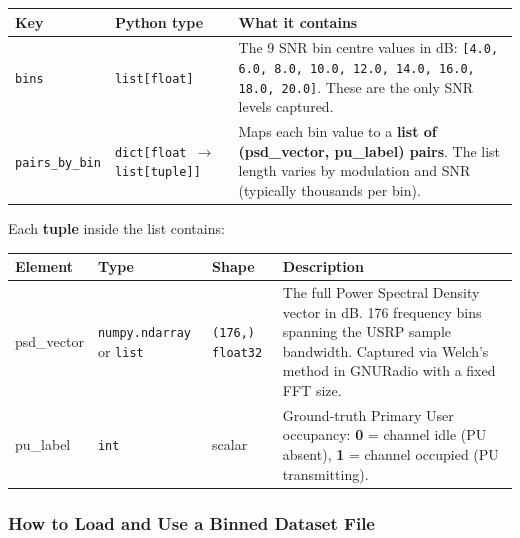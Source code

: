 \documentclass[11pt,a4paper]{article}
\begin{document}
\begin{center}
\renewcommand{\arraystretch}{1.35}
\begin{tabularx}{\textwidth}{>{\ttfamily}l l X}
\toprule
\textbf{Key} & \textbf{Python type} & \textbf{What it contains} \\
\midrule
\texttt{bins}
  & \texttt{list[float]}
  & The 9 SNR bin centre values in dB:
    \texttt{[4.0, 6.0, 8.0, 10.0, 12.0, 14.0, 16.0, 18.0, 20.0]}.
    These are the only SNR levels captured. \\[4pt]
\texttt{pairs\_by\_bin}
  & \texttt{dict[float $\to$ list[tuple]]}
  & Maps each bin value to a \textbf{list of (psd\_vector, pu\_label) pairs}.
    The list length varies by modulation and SNR (typically thousands per bin).\\
\bottomrule
\end{tabularx}
\end{center}

\smallskip
\noindent Each \textbf{tuple} inside the list contains:

\begin{center}
\renewcommand{\arraystretch}{1.35}
\begin{tabularx}{\textwidth}{>{\ttfamily}l l l X}
\toprule
\textbf{Element} & \textbf{Type} & \textbf{Shape} & \textbf{Description} \\
\midrule
psd\_vector
  & \texttt{numpy.ndarray} or \texttt{list}
  & \texttt{(176,)} \texttt{float32}
  & The full Power Spectral Density vector in dB. 176 frequency bins
    spanning the USRP sample bandwidth. Captured via Welch's method
    in GNURadio with a fixed FFT size. \\[4pt]
pu\_label
  & \texttt{int}
  & scalar
  & Ground-truth Primary User occupancy:
    \textbf{0} = channel idle (PU absent),
    \textbf{1} = channel occupied (PU transmitting). \\
\bottomrule
\end{tabularx}
\end{center}

\subsubsection{How to Load and Use a Binned Dataset File}
\end{document}
